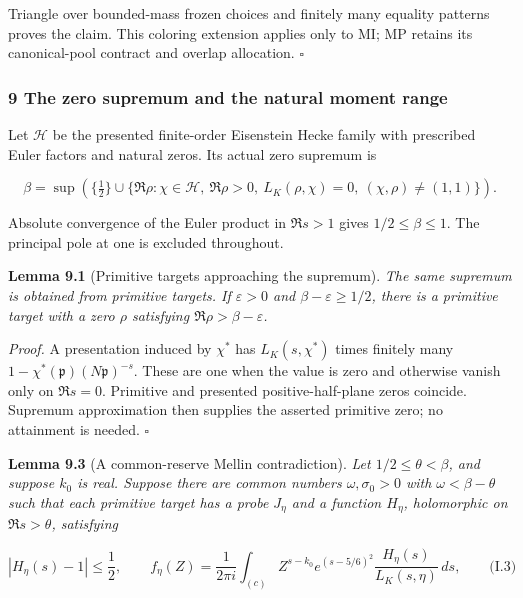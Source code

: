 Triangle over bounded-mass frozen choices and finitely many equality patterns proves the claim. This coloring extension applies only to MI; MP retains its canonical-pool contract and overlap allocation. \(\square\)

\hypertarget{init:section}{}

\label{init:section}

\hypertarget{the-zero-supremum-and-the-natural-moment-range}{%
\subsubsection{9 The zero supremum and the natural moment range}\label{the-zero-supremum-and-the-natural-moment-range}}

Let \(\mathcal H\) be the presented finite-order Eisenstein Hecke family with prescribed Euler factors and natural zeros. Its actual zero supremum is

\[
\beta=\sup\left(\{\tfrac12\}\cup
 \{\Re\rho:\chi\in\mathcal H,\ \Re\rho>0,\
 L_K(\rho,\chi)=0,\ (\chi,\rho)\ne(1,1)\}\right).
\]

Absolute convergence of the Euler product in \(\Re s>1\) gives \(1/2\le\beta\le1\). The principal pole at one is excluded throughout.

\textbf{Lemma 9.1} (Primitive targets approaching the supremum). \emph{\hypertarget{init:primitive-supremum}{}\label{init:primitive-supremum} The same supremum is obtained from primitive targets. If \(\varepsilon>0\) and \(\beta-\varepsilon\ge1/2\), there is a primitive target with a zero \(\rho\) satisfying \(\Re\rho>\beta-\varepsilon\).}

\emph{Proof.} A presentation induced by \(\chi^*\) has \(L_K(s,\chi^*)\) times finitely many \(1-\chi^*(\mathfrak p)(N\mathfrak p)^{-s}\). These are one when the value is zero and otherwise vanish only on \(\Re s=0\). Primitive and presented positive-half-plane zeros coincide. Supremum approximation then supplies the asserted primitive zero; no attainment is needed. \(\square\)

\textbf{Lemma 9.3} (A common-reserve Mellin contradiction). \emph{\hypertarget{init:mellin-return}{}\label{init:mellin-return} Let \(1/2\le\theta<\beta\), and suppose \(k_0\) is real. Suppose there are common numbers \(\omega,\sigma_0>0\) with \(\omega<\beta-\theta\) such that each primitive target has a probe \(J_\eta\) and a function \(H_\eta\), holomorphic on \(\Re s>\theta\), satisfying \hypertarget{init:signal}{}\label{init:signal}}

\[
|H_\eta(s)-1|\le\frac12,
 \qquad
 f_\eta(Z)=\frac1{2\pi i}\int_{(c)}
 Z^{s-k_0}e^{(s-5/6)^2}
 \frac{H_\eta(s)}{L_K(s,\eta)}\,ds,
 \qquad\text{(I.3)}
\]

